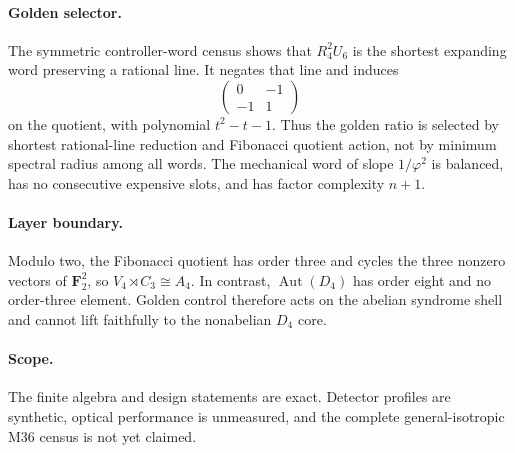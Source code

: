 \paragraph{Golden selector.}
The symmetric controller-word census shows that $R_4^2U_6$ is the shortest
expanding word preserving a rational line.  It negates that line and induces
\[
\begin{pmatrix}0&-1\\-1&1\end{pmatrix}
\]
on the quotient, with polynomial $t^2-t-1$.  Thus the golden ratio is selected
by shortest rational-line reduction and Fibonacci quotient action, not by minimum
spectral radius among all words.  The mechanical word of slope $1/\varphi^2$ is
balanced, has no consecutive expensive slots, and has factor complexity $n+1$.

\paragraph{Layer boundary.}
Modulo two, the Fibonacci quotient has order three and cycles the three nonzero
vectors of $\mathbf F_2^2$, so $V_4\rtimes C_3\cong A_4$.  In contrast,
$\operatorname{Aut}(D_4)$ has order eight and no order-three element.  Golden
control therefore acts on the abelian syndrome shell and cannot lift faithfully
to the nonabelian $D_4$ core.

\paragraph{Scope.}
The finite algebra and design statements are exact.  Detector profiles are
synthetic, optical performance is unmeasured, and the complete general-isotropic
M36 census is not yet claimed.
